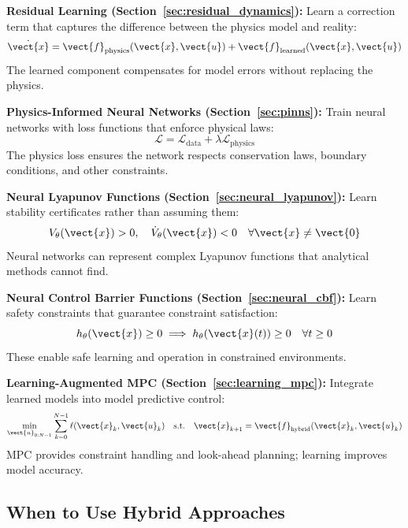\textbf{Residual Learning (Section~\ref{sec:residual_dynamics}):} Learn a correction term that captures the difference between the physics model and reality:
\begin{equation}
\dot{\vect{x}} = \vect{f}_{\text{physics}}(\vect{x}, \vect{u}) + \vect{f}_{\text{learned}}(\vect{x}, \vect{u})
\end{equation}
The learned component compensates for model errors without replacing the physics.

\textbf{Physics-Informed Neural Networks (Section~\ref{sec:pinns}):} Train neural networks with loss functions that enforce physical laws:
\begin{equation}
\mathcal{L} = \mathcal{L}_{\text{data}} + \lambda \mathcal{L}_{\text{physics}}
\end{equation}
The physics loss ensures the network respects conservation laws, boundary conditions, and other constraints.

\textbf{Neural Lyapunov Functions (Section~\ref{sec:neural_lyapunov}):} Learn stability certificates rather than assuming them:
\begin{equation}
V_\theta(\vect{x}) > 0, \quad \dot{V}_\theta(\vect{x}) < 0 \quad \forall \vect{x} \neq \vect{0}
\end{equation}
Neural networks can represent complex Lyapunov functions that analytical methods cannot find.

\textbf{Neural Control Barrier Functions (Section~\ref{sec:neural_cbf}):} Learn safety constraints that guarantee constraint satisfaction:
\begin{equation}
h_\theta(\vect{x}) \geq 0 \implies h_\theta(\vect{x}(t)) \geq 0 \quad \forall t \geq 0
\end{equation}
These enable safe learning and operation in constrained environments.

\textbf{Learning-Augmented MPC (Section~\ref{sec:learning_mpc}):} Integrate learned models into model predictive control:
\begin{equation}
\min_{\vect{u}_{0:N-1}} \sum_{k=0}^{N-1} \ell(\vect{x}_k, \vect{u}_k) \quad \text{s.t.} \quad \vect{x}_{k+1} = \vect{f}_{\text{hybrid}}(\vect{x}_k, \vect{u}_k)
\end{equation}
MPC provides constraint handling and look-ahead planning; learning improves model accuracy.

\subsection{When to Use Hybrid Approaches}

